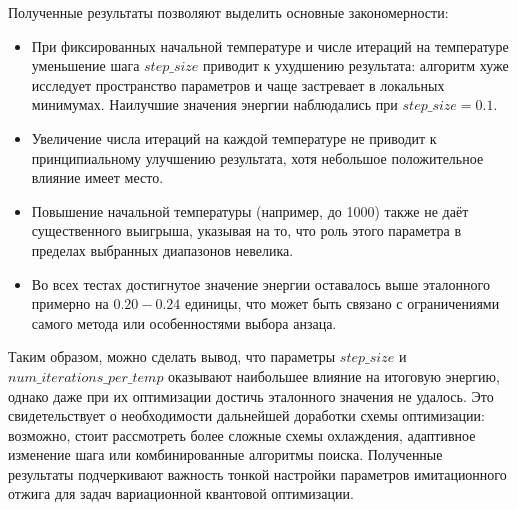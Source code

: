 \documentclass[a4paper]{report}
\begin{document}
Полученные результаты позволяют выделить основные закономерности:
\begin{itemize}
    \item При фиксированных начальной температуре и числе итераций на температуре уменьшение шага $step\_size$ приводит к ухудшению результата: алгоритм хуже исследует пространство параметров и чаще застревает в локальных минимумах. Наилучшие значения энергии наблюдались при $step\_size = 0.1$.
    \item Увеличение числа итераций на каждой температуре не приводит к принципиальному улучшению результата, хотя небольшое положительное влияние имеет место.
    \item Повышение начальной температуры (например, до 1000) также не даёт существенного выигрыша, указывая на то, что роль этого параметра в пределах выбранных диапазонов невелика.
    \item Во всех тестах достигнутое значение энергии оставалось выше эталонного примерно на $0.20-0.24$ единицы, что может быть связано с ограничениями самого метода или особенностями выбора анзаца.
\end{itemize}

Таким образом, можно сделать вывод, что параметры $step\_size$ и $num\_iterations\_per\_temp$ оказывают наибольшее влияние на итоговую энергию, однако даже при их оптимизации достичь эталонного значения не удалось. Это свидетельствует о необходимости дальнейшей доработки схемы оптимизации: возможно, стоит рассмотреть более сложные схемы охлаждения, адаптивное изменение шага или комбинированные алгоритмы поиска. Полученные результаты подчеркивают важность тонкой настройки параметров имитационного отжига для задач вариационной квантовой оптимизации.




\end{document}
